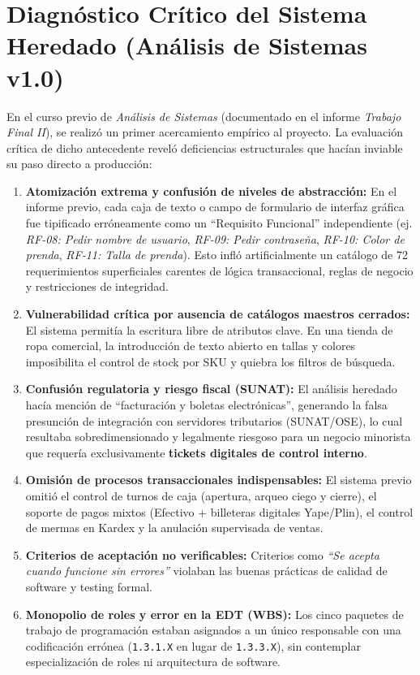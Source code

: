 \section{Diagnóstico Crítico del Sistema Heredado (Análisis de Sistemas v1.0)}
En el curso previo de \textit{Análisis de Sistemas} (documentado en el informe \textit{Trabajo Final II}), se realizó un primer acercamiento empírico al proyecto. La evaluación crítica de dicho antecedente reveló deficiencias estructurales que hacían inviable su paso directo a producción:

\begin{enumerate}
    \item \textbf{Atomización extrema y confusión de niveles de abstracción:} En el informe previo, cada caja de texto o campo de formulario de interfaz gráfica fue tipificado erróneamente como un ``Requisito Funcional'' independiente (ej. \textit{RF-08: Pedir nombre de usuario}, \textit{RF-09: Pedir contraseña}, \textit{RF-10: Color de prenda}, \textit{RF-11: Talla de prenda}). Esto infló artificialmente un catálogo de 72 requerimientos superficiales carentes de lógica transaccional, reglas de negocio y restricciones de integridad.
    \item \textbf{Vulnerabilidad crítica por ausencia de catálogos maestros cerrados:} El sistema permitía la escritura libre de atributos clave. En una tienda de ropa comercial, la introducción de texto abierto en tallas y colores imposibilita el control de stock por SKU y quiebra los filtros de búsqueda.
    \item \textbf{Confusión regulatoria y riesgo fiscal (SUNAT):} El análisis heredado hacía mención de ``facturación y boletas electrónicas'', generando la falsa presunción de integración con servidores tributarios (SUNAT/OSE), lo cual resultaba sobredimensionado y legalmente riesgoso para un negocio minorista que requería exclusivamente \textbf{tickets digitales de control interno}.
    \item \textbf{Omisión de procesos transaccionales indispensables:} El sistema previo omitió el control de turnos de caja (apertura, arqueo ciego y cierre), el soporte de pagos mixtos (Efectivo + billeteras digitales Yape/Plin), el control de mermas en Kardex y la anulación supervisada de ventas.
    \item \textbf{Criterios de aceptación no verificables:} Criterios como \textit{``Se acepta cuando funcione sin errores''} violaban las buenas prácticas de calidad de software y testing formal.
    \item \textbf{Monopolio de roles y error en la EDT (WBS):} Los cinco paquetes de trabajo de programación estaban asignados a un único responsable con una codificación errónea (\texttt{1.3.1.X} en lugar de \texttt{1.3.3.X}), sin contemplar especialización de roles ni arquitectura de software.
\end{enumerate}


